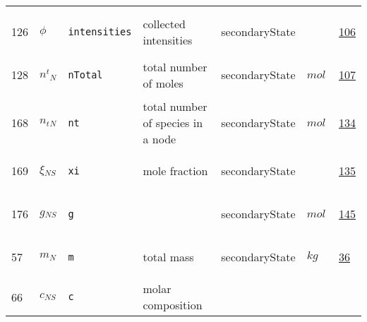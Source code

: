 \begin{longtable}{|p{1cm}|p{2.5cm}|p{4.5cm}|p{8cm}|p{3.0cm}|p{3cm}|p{1cm}|}
             & \\
            126
             & \hypertarget{"v:126"}{ $ {\phi}{_{}} $}
             & \verb|intensities|
             & collected intensities
             & \begin{lay}secondaryState \end{lay}
             & $  $
             &                 \hyperlink{"e:106"}{ 106 }
                 \\
            128
             & \hypertarget{"v:128"}{ $ {{n^t}}{_{N}} $}
             & \verb|nTotal|
             & total number of moles
             & \begin{lay}secondaryState \end{lay}
             & $ mol \, $
             &                 \hyperlink{"e:107"}{ 107 }
                 \\
            168
             & \hypertarget{"v:168"}{ $ {n_t}{_{N}} $}
             & \verb|nt|
             & total number of species in a node
             & \begin{lay}secondaryState \end{lay}
             & $ mol \, $
             &                 \hyperlink{"e:134"}{ 134 }
                 \\
            169
             & \hypertarget{"v:169"}{ $ {\xi}{_{{N S}}} $}
             & \verb|xi|
             & mole fraction
             & \begin{lay}secondaryState \end{lay}
             & $  $
             &                 \hyperlink{"e:135"}{ 135 }
                 \\
            176
             & \hypertarget{"v:176"}{ $ {g}{_{{N S}}} $}
             & \verb|g|
             & 
             & \begin{lay}secondaryState \end{lay}
             & $ mol \, $
             &                 \hyperlink{"e:145"}{ 145 }
                 \\
            57
             & \hypertarget{"v:57"}{ $ {m}{_{N}} $}
             & \verb|m|
             & total mass
             & \begin{lay}secondaryState \end{lay}
             & $ kg \, $
             &                 \hyperlink{"e:36"}{ 36 }
                 \\
            66
             & \hypertarget{"v:66"}{ $ {c}{_{{N S}}} $}
             & \verb|c|
             & molar composition

\end{longtable}
